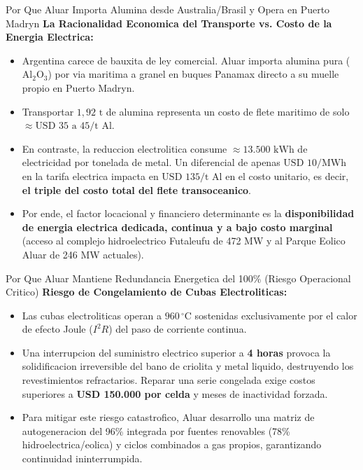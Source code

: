 \documentclass[10pt,a4paper]{article}
\theoremstyle{definition}
\begin{document}
\begin{conceptbox}{Por Que Aluar Importa Alumina desde Australia/Brasil y Opera en Puerto Madryn}
\textbf{La Racionalidad Economica del Transporte vs. Costo de la Energia Electrica:}
\begin{itemize}
    \item Argentina carece de bauxita de ley comercial. Aluar importa alumina pura ($\text{Al}_2\text{O}_3$) por via maritima a granel en buques Panamax directo a su muelle propio en Puerto Madryn.
    \item Transportar $1,92\text{ t}$ de alumina representa un costo de flete maritimo de solo $\approx \text{USD } 35\text{ a }45/\text{t Al}$.
    \item En contraste, la reduccion electrolitica consume $\approx 13.500\text{ kWh}$ de electricidad por tonelada de metal. Un diferencial de apenas $\text{USD } 10/\text{MWh}$ en la tarifa electrica impacta en $\text{USD } 135/\text{t Al}$ en el costo unitario, es decir, \textbf{el triple del costo total del flete transoceanico}.
    \item Por ende, el factor locacional y financiero determinante es la \textbf{disponibilidad de energia electrica dedicada, continua y a bajo costo marginal} (acceso al complejo hidroelectrico Futaleufu de 472 MW y al Parque Eolico Aluar de 246 MW actuales).
\end{itemize}
\end{conceptbox}

\begin{conceptbox}{Por Que Aluar Mantiene Redundancia Energetica del 100\% (Riesgo Operacional Critico)}
\textbf{Riesgo de Congelamiento de Cubas Electroliticas:}
\begin{itemize}
    \item Las cubas electroliticas operan a $960\,^\circ\text{C}$ sostenidas exclusivamente por el calor de efecto Joule ($I^2 R$) del paso de corriente continua.
    \item Una interrupcion del suministro electrico superior a \textbf{4 horas} provoca la solidificacion irreversible del bano de criolita y metal liquido, destruyendo los revestimientos refractarios. Reparar una serie congelada exige costos superiores a \textbf{USD 150.000 por celda} y meses de inactividad forzada.
    \item Para mitigar este riesgo catastrofico, Aluar desarrollo una matriz de autogeneracion del 96\% integrada por fuentes renovables (78\% hidroelectrica/eolica) y ciclos combinados a gas propios, garantizando continuidad ininterrumpida.
\end{itemize}
\end{conceptbox}
\end{document}
